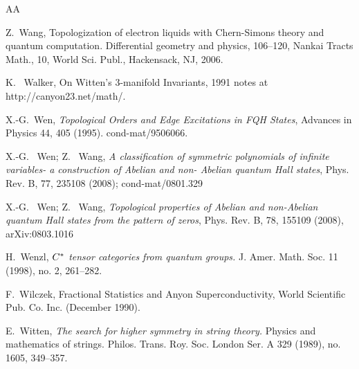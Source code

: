 \documentclass[12pt,psamsfonts]{amsart}
\numberwithin{equation}{section}
\theoremstyle{definition}
\begin{document}
\begin{thebibliography}{AA}



Z.\ Wang, Topologization of electron liquids with Chern-Simons theory and quantum computation.
Differential geometry and physics, 106--120, Nankai Tracts Math.,
10, World Sci. Publ., Hackensack, NJ, 2006.

K. \ Walker, On Witten's 3-manifold
Invariants, 1991 notes at http://canyon23.net/math/.

X.-G.\ Wen, \emph{Topological Orders and Edge Excitations in FQH
States}, Advances in Physics 44, 405 (1995). cond-mat/9506066.

X.-G. \ Wen; Z. \ Wang, \emph{A classification of symmetric polynomials of infinite variables-
a construction of Abelian and non- Abelian quantum Hall states},
Phys. Rev. B, 77, 235108 (2008); cond-mat/0801.329

X.-G. \ Wen; Z. \ Wang, \emph{Topological properties of Abelian and non-Abelian quantum Hall states from the pattern of zeros},
Phys. Rev. B, 78, 155109 (2008), arXiv:0803.1016


H.\ Wenzl, \emph{$C\sp *$ tensor categories from quantum groups.}
 J. Amer. Math. Soc. 11 (1998), no. 2, 261--282.

F.\ Wilczek, Fractional Statistics and Anyon
Superconductivity, World Scientific Pub. Co. Inc. (December 1990).



 E.\ Witten, \emph{The search for higher symmetry in string
theory.} Physics and mathematics of strings. Philos. Trans. Roy. Soc. London Ser. A 329 (1989), no. 1605, 349--357.



\end{thebibliography}
\end{document}
